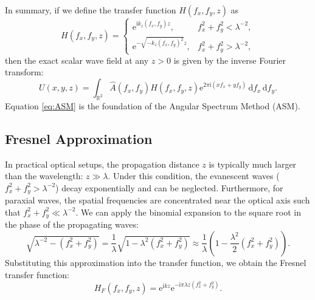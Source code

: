 \documentclass[12pt]{article}
\begin{document}
In summary, if we define the transfer function \( H(f_x, f_y, z) \) as
\[
    H(f_x, f_y, z) = \begin{cases}
        \mathrm{e}^{\mathrm{i} k_z(f_x, f_y) z}, & f_x^2 + f_y^2 < \lambda^{-2}, \\
        \mathrm{e}^{-\sqrt{-k_z(f_x, f_y)^2} z}, & f_x^2 + f_y^2 > \lambda^{-2},
    \end{cases}
\]
then the exact scalar wave field at any \( z > 0 \) is given by the inverse Fourier transform:
\begin{equation} \label{eq:ASM}
    U(x, y, z) = \int_{\mathbb{R}^2} \hat{A}(f_x, f_y) H(f_x, f_y, z) \mathrm{e}^{2\pi \mathrm{i} 
    (x f_x + y f_y)}\,\mathrm{d}f_x \, \mathrm{d}f_y.
\end{equation}
Equation \eqref{eq:ASM} is the foundation of the Angular Spectrum Method (ASM).

\subsection{Fresnel Approximation}

In practical optical setups, the propagation distance \( z \) is typically much larger than the wavelength:
\( z \gg \lambda \). Under this condition, the evanescent waves (\( f_x^2 + f_y^2 > \lambda^{-2} \)) 
decay exponentially and can be neglected. Furthermore, for paraxial waves, the spatial frequencies 
are concentrated near the optical axis such that \( f_x^2 + f_y^2 \ll \lambda^{-2} \). 
We can apply the binomial expansion to the square root in the phase of the propagating waves:
\[
    \sqrt{\lambda^{-2} - (f_x^2 + f_y^2)} = \frac{1}{\lambda} \sqrt{1 - \lambda^2(f_x^2 + f_y^2)}
    \approx \frac{1}{\lambda} \left( 1 - \frac{\lambda^2}{2}(f_x^2 + f_y^2) \right).
\]
Substituting this approximation into the transfer function, we obtain the Fresnel transfer function:
\begin{equation} \label{eq:Fresnel_transfer}
    H_{F}(f_x, f_y, z) = \mathrm{e}^{\mathrm{i} k z} \mathrm{e}^{-\mathrm{i} \pi \lambda z 
    (f_x^2 + f_y^2)}.
\end{equation}
\end{document}
